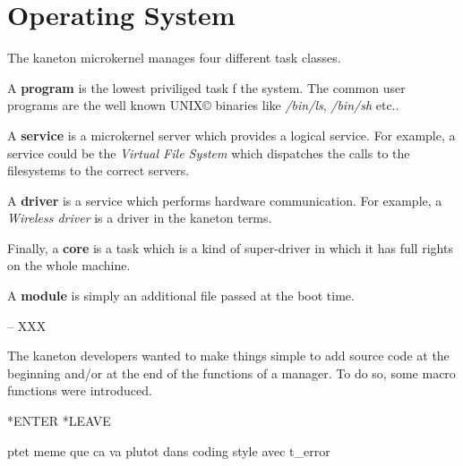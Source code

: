 %
%

\section{Operating System}

The kaneton microkernel manages four different task classes.

A \textbf{program} is the lowest priviliged task f the system. The common
user programs are the well known UNIX{\copyright} binaries like
\textit{/bin/ls}, \textit{/bin/sh} etc..

A \textbf{service} is a microkernel server which provides a logical
service. For example, a service could be the \textit{Virtual File System}
which dispatches the calls to the filesystems to the correct servers.

A \textbf{driver} is a service which performs hardware communication.
For example, a \textit{Wireless driver} is a driver in the kaneton terms.

Finally, a \textbf{core} is a task which is a kind of super-driver in which
it has full rights on the whole machine.

A \textbf{module} is simply an additional file passed at the boot time.

-- XXX

The kaneton developers wanted to make things simple to add source code
at the beginning and/or at the end of the functions of a manager. To do
so, some macro functions were introduced.

*ENTER *LEAVE

ptet meme que ca va plutot dans coding style avec t\_error

